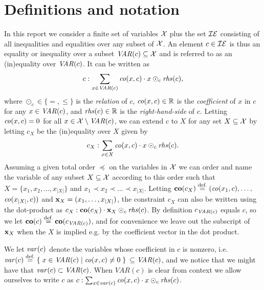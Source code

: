 \section{Definitions and notation}\label{sec:def}
In this report we consider a finite set of variables $\mathcal{X}$ plus the set $\mathcal{IE}$ consisting of all inequalities and equalities over any subset of $\mathcal{X}$. An element $c\in\mathcal{IE}$ is thus an equality or inequality over a subset $\mathit{VAR}(c)\subseteq\mathcal{X}$ and is referred to as an (in)equality over $\mathit{VAR}(c)$. 
It can be written as
\begin{equation}\label{eq:ineq}
c: \sum_{x\in \mathit{VAR}(c)}\mathit{co}(x,c)\cdot x\odot_c \mathit{rhs}(c),
\end{equation} 
where $\odot_c\in\{=, \leq\}$ is the \emph{relation} of $c$, $\mathit{co}(x,c)\in\mathbb{R}$ is the \emph{coefficient} of $x$ in $c$ for any $x\in \mathit{VAR}(c)$, and $\mathit{rhs}(c)\in\mathbb{R}$ is the \emph{right-hand-side} of $c$.
%
Letting $\mathit{co}(x,c)= 0$ for all $x\in \mathcal{X}\setminus\mathit{VAR}(c)$, we can extend $c$ to $X$ for any set $X\subseteq \mathcal{X}$ by letting $c_X$ be the (in)equality over $X$ given by
\begin{equation}\label{eq:constraintX}
c_{X}: \sum_{x\in X} \mathit{co}(x,c)\cdot x \odot_c\mathit{rhs}(c).
\end{equation}
Assuming a given total order $\preceq$ on the variables in $\mathcal{X}$ we can order and name the variable of any subset $X\subseteq \mathcal{X}$ according to this order such that $X = \{x_1, x_2, \ldots, x_{|X|}\}$ and $x_1\prec x_2\prec \ldots \prec x_{|X|}$. 
Letting $\mathbf{co}(c_X) \overset{\text{def.}}= (\mathit{co}(x_1,c),\ldots,$ $\mathit{co}(x_{|X|},c))$ and $\mathbf{x}_X = (x_1,\ldots, x_{|X|})$, the constraint $c_X$ can also be written using the dot-product as $c_X:\mathbf{co}(c_X)\cdot\mathbf{x}_X\odot_c \mathit{rhs}(c)$. 
By definition $c_{\mathit{VAR}(c)}$ equals $c$, so we let $\mathbf{co}(c)\overset{\text{def.}}= \mathbf{co}(c_{\mathit{VAR}(c)})$, and for convenience we leave out the subscript of $\mathbf{x}_X$ when the $X$ is implied e.g. by the coefficient vector in the dot product. 

We let $\mathit{var}(c)$ denote the variables whose coefficient in $c$ is nonzero, i.e. $\mathit{var}(c)\overset{\text{def.}}= \{\;{x\in \mathit{VAR}(c)}\;|\;{\mathit{co}(x,c) \neq 0}\;\}$ $\subseteq \mathit{VAR}(c)$, and we notice that we might have that $\mathit{var}(c)\subset \mathit{VAR}(c)$. When $VAR(c)$ is clear from context we allow ourselves to write $c$ as $c : \sum_{x\in \mathit{var}(c)}\mathit{co}(x,c)\cdot x \odot_c \mathit{rhs}(c)$.

